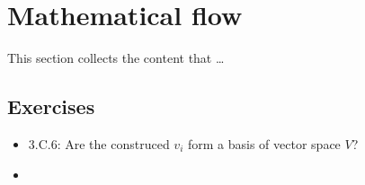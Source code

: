 \documentclass[../../note.tex]{subfiles}
\begin{document}
\chapter{Mathematical flow}
This section collects the content that \dots

\section{Exercises}
\begin{itemize}
    \item 3.C.6: Are the construced $v_i$ form a basis of vector space $V$?
    \item 
\end{itemize}
\end{document}
